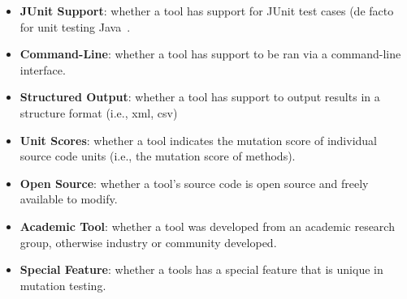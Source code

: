 \begin{itemize}
  \item \textbf{JUnit Support}: whether a tool has support for JUnit test cases (de facto for unit testing Java~\cite{JUnit}.
  \item \textbf{Command-Line}: whether a tool has support to be ran via a command-line interface.
  \item \textbf{Structured Output}: whether a tool has support to output results in a structure format (i.e., \gls{xml}, \gls{csv})
  \item \textbf{Unit Scores}: whether a tool indicates the mutation score of individual source code units (i.e., the mutation score of methods).
  \item \textbf{Open Source}: whether a tool's source code is open source and freely available to modify.
  \item \textbf{Academic Tool}: whether a tool was developed from an academic research group, otherwise industry or community developed.
  \item \textbf{Special Feature}: whether a tools has a special feature that is unique in mutation testing.
\end{itemize}

